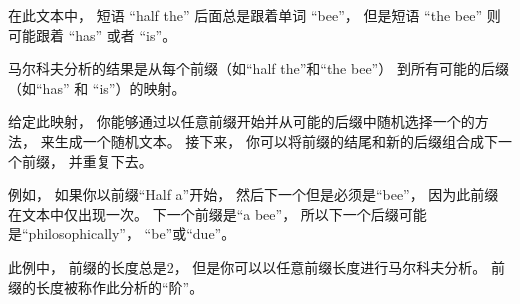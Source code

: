 
在此文本中， 短语 ``half the'' 后面总是跟着单词 ``bee''，  但是短语 ``the
bee'' 则可能跟着 ``has'' 或者  ``is''。  



马尔科夫分析的结果是从每个前缀（如``half the''和``the bee''）
到所有可能的后缀（如``has'' 和 ``is''）的映射。  



给定此映射， 你能够通过以任意前缀开始并从可能的后缀中随机选择一个的方法， 来生成一个随机文本。  
接下来， 你可以将前缀的结尾和新的后缀组合成下一个前缀， 并重复下去。  

例如， 如果你以前缀``Half a''开始， 然后下一个但是必须是``bee''， 
因为此前缀在文本中仅出现一次。  下一个前缀是``a bee''， 
所以下一个后缀可能是``philosophically''， ``be''或``due''。  

此例中， 前缀的长度总是2， 但是你可以以任意前缀长度进行马尔科夫分析。  
前缀的长度被称作此分析的“阶”。  


